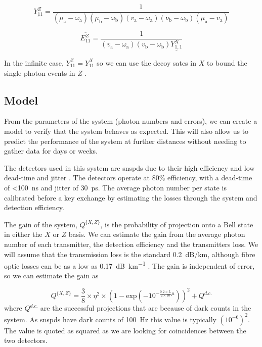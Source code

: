 \begin{equation}
	\underline{Y_{11}^Z} = \frac{1}{\left(\mu_{\mathrm{a}}-\omega_{\mathrm{a}}\right)\left(\mu_{\mathrm{b}}-\omega_{\mathrm{b}}\right)\left(v_{\mathrm{a}}-\omega_{\mathrm{a}}\right)\left(\nu_{\mathrm{b}}-\omega_{\mathrm{b}}\right)\left(\mu_{\mathrm{a}}-v_{\mathrm{a}}\right)}
\end{equation}

\begin{equation}
	\overline{E_{11}^Z} = \frac{1}{\left(v_{\mathrm{a}}-\omega_{\mathrm{a}}\right)\left(v_{\mathrm{b}}-\omega_{\mathrm{b}}\right) \underline{Y^{X}_{1,1}}}
\end{equation}

In the infinite case, $Y_{11}^Z = Y_{11}^X$ so we can use the decoy sates in $X$ to bound the single photon events in $Z$ \cite{zhou2016}. 

\subsection{Model}

From the parameters of the system (photon numbers and errors), we can create a model to verify that the system behaves as expected. This will also allow us to predict the performance of the system at further distances without needing to gather data for days or weeks. 

The detectors used in this system are \acp{snspd} due to their high efficiency and low dead-time and jitter \cite{}. The detectors operate at $80\%$ efficiency, with a dead-time of \SI{<100}{ns} and jitter of \SI{30}{ps}. The average photon number per state is calibrated before a key exchange by estimating the losses through the system and detection efficiency.

The gain of the system, $Q^{ \{X,Z\} }$, is the probability of projection onto a Bell state in either the $X$ or $Z$ basis. We can estimate the gain from the average photon number of each transmitter, the detection efficiency and the transmitters loss. We will assume that the transmission loss is the standard \SI{0.2}{dB/km}, although fibre optic losses can be as a low as \SI{0.17}{dB\per\km} \cite{corningULL}. The gain is independent of error, so we can estimate the gain as 

\begin{equation}
	Q^{ \{X,Z\} } = \frac{3}{8}  \times \eta^2 \times \left( 1 - \text{exp} \left( -10^{- \frac{0.2 \times L}{2 \times 10} \mu}  \right)  \right)^2 + Q^{d.c.}
\end{equation}
where $Q^{d.c.}$ are the successful projections that are because of dark counts in the system. As \acp{snspd} have dark counts of \SI{100}{Hz} this value is typically $\left(10^{-6}\right)^2$. The value is quoted as squared as we are looking for coincidences between the two detectors. 

